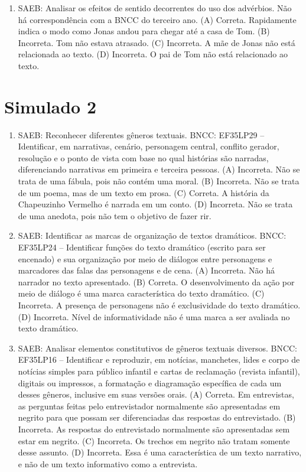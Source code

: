 \begin{enumerate}
\item
SAEB: Analisar os efeitos de sentido decorrentes do uso dos advérbios. Não há correspondência com a BNCC do terceiro ano. 
(A) Correta.  Rapidamente indica o modo como Jonas andou para chegar até a casa de Tom.
(B) Incorreta. Tom não estava atrasado. 
(C) Incorreta. A mãe de Jonas não está relacionada ao texto. 
(D) Incorreta. O pai de Tom não está relacionado ao texto.
\end{enumerate}

\section*{Simulado 2}

\begin{enumerate}
\item
SAEB: Reconhecer diferentes gêneros textuais.
BNCC: EF35LP29 -- Identificar, em narrativas, cenário, personagem central,
conflito gerador, resolução e o ponto de vista com base no qual
histórias são narradas, diferenciando narrativas em primeira e terceira
pessoas.
(A) Incorreta. Não se trata de uma fábula, pois não contém uma moral.
(B) Incorreta. Não se trata de um poema, mas de um texto em prosa.
(C) Correta. A história da Chapeuzinho Vermelho é narrada em um conto.
(D) Incorreta. Não se trata de uma anedota, pois não tem o objetivo de fazer rir.

\item
SAEB: Identificar as marcas de organização de textos dramáticos.
BNCC: EF35LP24 -- Identificar funções do texto dramático (escrito para ser encenado) e sua organização
por meio de diálogos entre personagens e marcadores das falas das personagens e de cena.
(A) Incorreta. Não há narrador no texto apresentado.
(B) Correta. O desenvolvimento da ação por meio de diálogo é uma marca característica do texto dramático.
(C) Incorreta. A presença de personagens não é exclusividade do texto dramático.
(D) Incorreta. Nível de informatividade não é uma marca a ser avaliada no texto dramático.

\item
SAEB: Analisar elementos constitutivos de gêneros textuais diversos.
BNCC: EF35LP16 -- Identificar e reproduzir, em notícias, manchetes, lides e
corpo de notícias simples para público infantil e cartas de reclamação
(revista infantil), digitais ou impressos, a formatação e diagramação
específica de cada um desses gêneros, inclusive em suas versões orais.
(A) Correta. Em entrevistas, as perguntas feitas pelo entrevistador
normalmente são apresentadas em negrito para que possam ser
diferenciadas das respostas do entrevistado.
(B) Incorreta. As respostas do entrevistado normalmente são apresentadas
sem estar em negrito.
(C) Incorreta. Os trechos em negrito não tratam somente desse assunto.
(D) Incorreta. Essa é uma característica de um texto narrativo, e não de
um texto informativo como a entrevista.


\end{enumerate}
